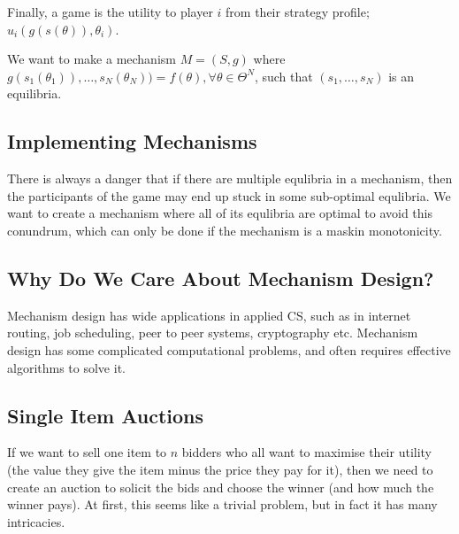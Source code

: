 Finally, a game is the utility to player $i$ from their strategy
profile; $u_i(g(s(\theta)), \theta_i)$.

We want to make a mechanism $M = (S,g)$ where
$g(s_1(\theta_1)), \dots, s_N(\theta_N)) =
f(\theta), \forall \theta \in \Theta^N$, such that $(s_1,\dots,s_N)$
is an equilibria.

\subsection{Implementing Mechanisms}

There is always a danger that if there are multiple equlibria in a
mechanism, then the participants of the game may end up stuck in some
sub-optimal equlibria. We want to create a mechanism where all of its
equlibria are optimal to avoid this conundrum, which can only be done
if the mechanism is a maskin monotonicity.


\subsection{Why Do We Care About Mechanism Design?}

Mechanism design has wide applications in applied CS, such as in
internet routing, job scheduling, peer to peer systems, cryptography
etc. Mechanism design has some complicated computational problems, and
often requires effective algorithms to solve it.

\subsection{Single Item Auctions}

If we want to sell one item to $n$ bidders who all want to maximise
their utility (the value they give the item minus the price they pay
for it), then we need to create an auction to solicit the bids and
choose the winner (and how much the winner pays). At first, this seems
like a trivial problem, but in fact it has many intricacies.


